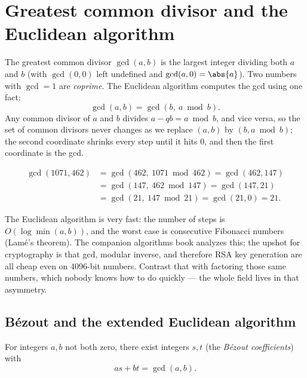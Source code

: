 \section{Greatest common divisor and the Euclidean algorithm}
\label{ch40:gcd}

The greatest common divisor $\gcd(a,b)$ is the largest integer dividing both $a$ and $b$ (with
$\gcd(0,0)$ left undefined and $\gcd(a,0)=\abs{a}$). Two numbers with $\gcd = 1$ are
\emph{coprime}. The Euclidean algorithm computes the gcd using one fact:
\[
  \gcd(a,b) = \gcd(b,\ a \bmod b).
\]
Any common divisor of $a$ and $b$ divides $a - qb = a\bmod b$, and vice versa, so the set of common
divisors never changes as we replace $(a,b)$ by $(b, a\bmod b)$; the second coordinate shrinks
every step until it hits $0$, and then the first coordinate is the gcd.

\begin{example}
\label{ch40:ex-euclid}
\[
\begin{aligned}
\gcd(1071,462) &= \gcd(462,\ 1071 \bmod 462) = \gcd(462, 147)\\
               &= \gcd(147,\ 462 \bmod 147) = \gcd(147, 21)\\
               &= \gcd(21,\ 147 \bmod 21)  = \gcd(21, 0) = 21.
\end{aligned}
\]
\end{example}

\begin{connectionbox}
The Euclidean algorithm is very fast: the number of steps is $O(\log \min(a,b))$, and the
worst case is consecutive Fibonacci numbers (Lam\'e's theorem). The companion algorithms book
analyzes this; the upshot for cryptography is that gcd, modular inverse, and therefore RSA key
generation are all cheap even on 4096-bit numbers. Contrast that with factoring those same numbers,
which nobody knows how to do quickly --- the whole field lives in that asymmetry.
\end{connectionbox}

\subsection{B\'ezout and the extended Euclidean algorithm}
\label{ch40:bezout}

\begin{theorem}
\label{ch40:thm-bezout}
For integers $a,b$ not both zero, there exist integers $s,t$ (the \emph{B\'ezout coefficients})
with
\[
  as + bt = \gcd(a,b).
\]
\end{theorem}

